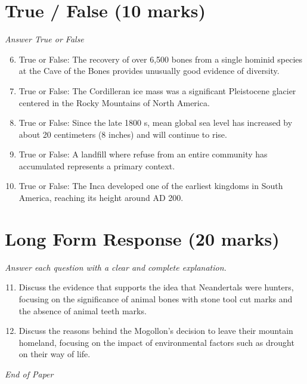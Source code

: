 \documentclass[12pt]{article}
\begin{document}
\section*{True / False (10 marks)}
\textit{Answer True or False}
\begin{enumerate}[label=\arabic*.]
\setcounter{enumi}{5}
\item True or False: The recovery of over 6,500 bones from a single hominid species at the Cave of the Bones provides unusually good evidence of diversity.
\item True or False: The Cordilleran ice mass was a significant Pleistocene glacier centered in the Rocky Mountains of North America.
\item True or False: Since the late 1800 s, mean global sea level has increased by about 20 centimeters (8 inches) and will continue to rise.
\item True or False: A landfill where refuse from an entire community has accumulated represents a primary context.
\item True or False: The Inca developed one of the earliest kingdoms in South America, reaching its height around AD 200.
\end{enumerate}

\section*{Long Form Response (20 marks)}
\textit{Answer each question with a clear and complete explanation.}
\begin{enumerate}[label=\arabic*.]
\setcounter{enumi}{10}
\item Discuss the evidence that supports the idea that Neandertals were hunters, focusing on the significance of animal bones with stone tool cut marks and the absence of animal teeth marks.
\item Discuss the reasons behind the Mogollon's decision to leave their mountain homeland, focusing on the impact of environmental factors such as drought on their way of life.
\end{enumerate}

\vfill
\noindent\textit{End of Paper}
\end{document}
